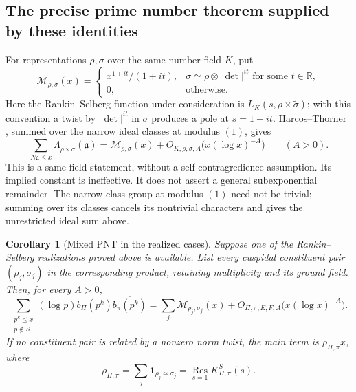 \documentclass[11pt,reqno]{amsart}
\numberwithin{equation}{section}
\newtheorem{corollary}[theorem]{Corollary}
\theoremstyle{definition}
\theoremstyle{remark}
\begin{document}
\subsection{The precise prime number theorem supplied by these identities}
For representations $\rho,\sigma$ over the same number field $K$, put
\[
 \mathcal M_{\rho,\sigma}(x)=
 \begin{cases}
 x^{1+it}/(1+it),&\sigma\simeq\rho\otimes|\det|^{it}
                         \text{ for some }t\in\mathbb R,\\
 0,&\text{otherwise}.
 \end{cases}
\]
Here the Rankin--Selberg function under consideration is
$L_K(s,\rho\times\widetilde\sigma)$; with this convention a twist by
$|\det|^{it}$ in $\sigma$ produces a pole at $s=1+it$.
Harcos--Thorner \cite[Theorem 2.1]{HT}, summed over the narrow ideal
classes at modulus $(1)$, gives
\begin{equation}\label{id:HT-PNT}
 \sum_{N\mathfrak a\le x}
 \Lambda_{\rho\times\widetilde\sigma}(\mathfrak a)
 =\mathcal M_{\rho,\sigma}(x)
   +O_{K,\rho,\sigma,A}\bigl(x(\log x)^{-A}\bigr)
 \qquad(A>0).
\end{equation}
This is a same-field statement, without a self-contragredience
assumption. Its implied constant is ineffective. It does not assert a
general subexponential remainder. The narrow class group at modulus
$(1)$ need not be trivial; summing over its classes cancels its
nontrivial characters and gives the unrestricted ideal sum above.

\begin{corollary}[Mixed PNT in the realized cases]\label{id:mixed-PNT}
Suppose one of the Rankin--Selberg realizations proved above is available.
List every cuspidal constituent pair $(\rho_j,\sigma_j)$ in the
corresponding product, retaining multiplicity and its ground field.
Then, for every $A>0$,
\begin{equation}\label{id:mixed-PNT-formula}
 \sum_{\substack{p^k\le x\\p\notin S}}
  (\log p)b_\Pi(p^k)\overline{b_\pi(p^k)}
 =\sum_j\mathcal M_{\rho_j,\sigma_j}(x)
       +O_{\Pi,\pi,E,F,A}\bigl(x(\log x)^{-A}\bigr).
\end{equation}
If no constituent pair is related by a nonzero norm twist, the main term
is $\rho_{\Pi,\pi}x$, where
\begin{equation}\label{id:residue-general}
 \rho_{\Pi,\pi}
 =\sum_j\boldsymbol 1_{\rho_j\simeq\sigma_j}
 =\operatorname*{Res}_{s=1}K_{\Pi,\pi}^S(s).
\end{equation}
\end{corollary}
\end{document}
